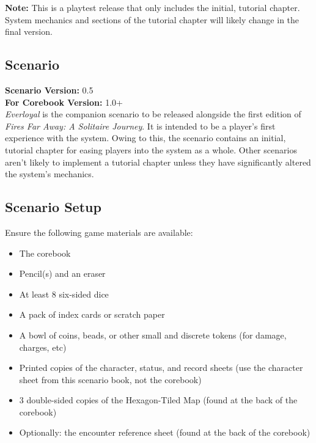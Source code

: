 \documentclass[12pt]{article}
\begin{document}
\vspace*{\fill}

\begin{center}
{\Large \textbf{Note:}
This is a playtest release that only includes the initial, tutorial chapter.\\
System mechanics and sections of the tutorial chapter will likely change in the final version.\\
}
\end{center}

\vspace*{\fill}

\pagebreak

\begin{multicols*}{2}


\section{Scenario}
\textbf{Scenario Version:} 0.5\\
\textbf{For Corebook Version:} 1.0+\\
\emph{Everloyal} is the companion scenario to be released alongside the first edition of \emph{Fires Far Away: A Solitaire Journey}. It is intended to be a player’s first experience with the system. Owing to this, the scenario contains an initial, tutorial chapter for easing players into the system as a whole. Other scenarios aren’t likely to implement a tutorial chapter unless they have significantly altered the system’s mechanics.

\subsection{Scenario Setup}
Ensure the following game materials are available:

\begin{itemize}
\item The corebook
\item Pencil(s) and an eraser
\item At least 8 six-sided dice
\item A pack of index cards or scratch paper
\item A bowl of coins, beads, or other small and discrete tokens (for damage, charges, etc)
\item Printed copies of the character, status, and record sheets (use the character sheet from this scenario book, not the corebook)
\item 3 double-sided copies of the Hexagon-Tiled Map (found at the back of the corebook)
\item Optionally: the encounter reference sheet (found at the back of the corebook)
\end{itemize}


\end{multicols*}
\end{document}
